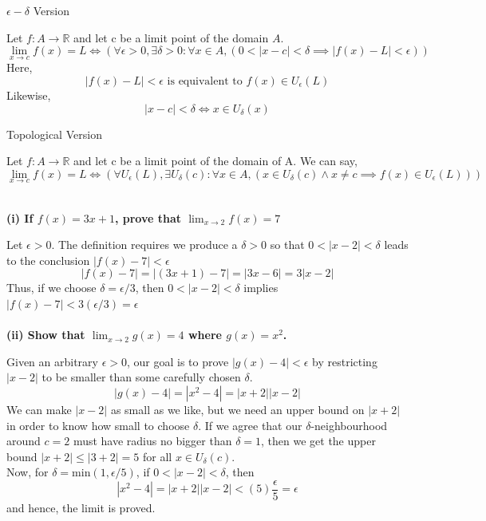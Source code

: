 \documentclass[12pt]{article}
\begin{document}
\underline{\textbf{}}

\begin{definition}{$\epsilon-\delta$ Version}

Let $f: A \to \mathbb{R}$ and let c be a limit point of the domain $A$.\\
\[
    \lim_{x \to c} f(x) = L \iff (\forall \epsilon>0, \exists\delta>0 : \forall x \in A, (0 < |x-c| < \delta \implies |f(x)-L| < \epsilon))
\]
Here, \[
    |f(x)-L|<\epsilon \text{ is equivalent to } f(x) \in U_\epsilon(L)
\]
Likewise, \[
    |x-c|<\delta \iff x \in U_\delta(x)
\]
\end{definition}

\begin{definition}{Topological Version}

    Let $f : A \to \mathbb{R}$ and let c be a limit point of the domain of A. We can say, \[
        \lim_{x \to c} f(x)=L \iff ( \forall U_\epsilon(L), \exists U_\delta(c) : \forall x \in A, ( x \in U_\delta(c) \land x \neq c \implies f(x) \in U_\epsilon(L) ) )
    \] \\
\end{definition}


\begin{exercise}{\textbf{(i) If $f(x) = 3x+1$, prove that $ \lim_{x \to 2} f(x) = 7 $}}

    Let $\epsilon>0$. The definition requires we produce a $\delta>0$ so that $0<|x-2|<\delta$ leads to the conclusion $|f(x)-7|<\epsilon$ \[
        |f(x)-7| = |(3x+1)-7| = |3x-6| = 3|x-2|
    \]
    Thus, if we choose $\delta=\epsilon/3$, then $0<|x-2|<\delta$ implies $|f(x)-7|<3(\epsilon/3)=\epsilon$ \\~\\
    \textbf{(ii) Show that $\lim_{x \to 2} g(x) = 4$ where $g(x)=x^2$.}
    
    Given an arbitrary $\epsilon>0$, our goal is to prove $|g(x)-4|<\epsilon$ by restricting $| x-2 |$ to be smaller than some carefully chosen $\delta$. \\\[
        |g(x)-4| = |x^2-4| = |x+2||x-2|
    \] We can make $|x-2|$ as small as we like, but we need an upper bound on $|x+2|$ in order to know how small to choose $\delta$. If we agree that our $\delta$-neighbourhood around $c=2$ must have radius no bigger than $\delta=1$, then we get the upper bound $|x+2|\le |3+2|=5$ for all $x\in U_\delta(c)$. \\
    Now, for $\delta=\text{min}(1,\epsilon/5)$, if $0<|x-2|<\delta$, then \[
        |x^2-4| = |x+2||x-2| < (5)\frac{\epsilon}{5} = \epsilon
    \] and hence, the limit is proved. \\~\\
\end{exercise}
\end{document}
